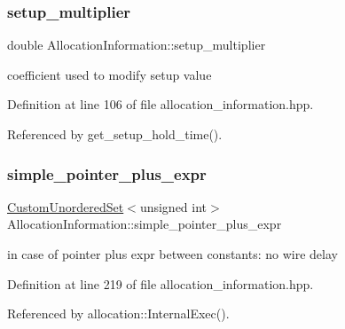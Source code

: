 \mbox{\label{classAllocationInformation_ad031131df1115300dffd3e353f0e01e2}} 
\subsubsection{\texorpdfstring{setup\+\_\+multiplier}{setup\_multiplier}}
{\footnotesize\ttfamily double Allocation\+Information\+::setup\+\_\+multiplier\hspace{0.3cm}{\ttfamily [private]}}



coefficient used to modify setup value 



Definition at line 106 of file allocation\+\_\+information.\+hpp.



Referenced by get\+\_\+setup\+\_\+hold\+\_\+time().

\mbox{\label{classAllocationInformation_a2d8c8212a7c90f4c513fbb768fc7a1f9}} 
\subsubsection{\texorpdfstring{simple\+\_\+pointer\+\_\+plus\+\_\+expr}{simple\_pointer\_plus\_expr}}
{\footnotesize\ttfamily \hyperlink{classCustomUnorderedSet}{Custom\+Unordered\+Set}$<$unsigned int$>$ Allocation\+Information\+::simple\+\_\+pointer\+\_\+plus\+\_\+expr\hspace{0.3cm}{\ttfamily [private]}}



in case of pointer plus expr between constants\+: no wire delay 



Definition at line 219 of file allocation\+\_\+information.\+hpp.



Referenced by allocation\+::\+Internal\+Exec().

